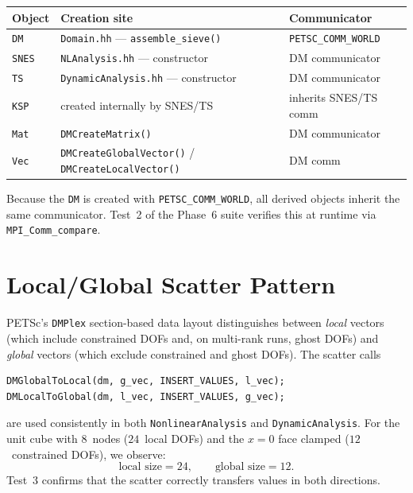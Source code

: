 \begin{center}
\begin{tabular}{@{}lll@{}}
\toprule
Object & Creation site                        & Communicator \\
\midrule
\texttt{DM}   & \texttt{Domain.hh} — \texttt{assemble\_sieve()} & \texttt{PETSC\_COMM\_WORLD} \\
\texttt{SNES} & \texttt{NLAnalysis.hh} — constructor            & DM communicator             \\
\texttt{TS}   & \texttt{DynamicAnalysis.hh} — constructor        & DM communicator             \\
\texttt{KSP}  & created internally by SNES/TS                    & inherits SNES/TS comm       \\
\texttt{Mat}  & \texttt{DMCreateMatrix()}                        & DM communicator             \\
\texttt{Vec}  & \texttt{DMCreateGlobalVector()} / \texttt{DMCreateLocalVector()} & DM comm \\
\bottomrule
\end{tabular}
\end{center}

Because the \texttt{DM} is created with \texttt{PETSC\_COMM\_WORLD}, all
derived objects inherit the same communicator.  Test~2 of the Phase~6 suite
verifies this at runtime via \texttt{MPI\_Comm\_compare}.


\section{Local/Global Scatter Pattern}
\label{sec:phase6-scatter}

PETSc's \texttt{DMPlex} section-based data layout distinguishes between
\emph{local} vectors (which include constrained DOFs and, on multi-rank
runs, ghost DOFs) and \emph{global} vectors (which exclude constrained
and ghost DOFs).  The scatter calls

\begin{lstlisting}[style=cppstyle,caption={Local/Global scatter pattern.}]
DMGlobalToLocal(dm, g_vec, INSERT_VALUES, l_vec);
DMLocalToGlobal(dm, l_vec, INSERT_VALUES, g_vec);
\end{lstlisting}

\noindent are used consistently in both \texttt{NonlinearAnalysis} and
\texttt{DynamicAnalysis}.  For the unit cube with $8$~nodes ($24$~local
DOFs) and the $x=0$ face clamped ($12$~constrained DOFs), we observe:
\[
  \text{local size} = 24, \qquad
  \text{global size} = 12.
\]
Test~3 confirms that the scatter correctly transfers values in both
directions.


